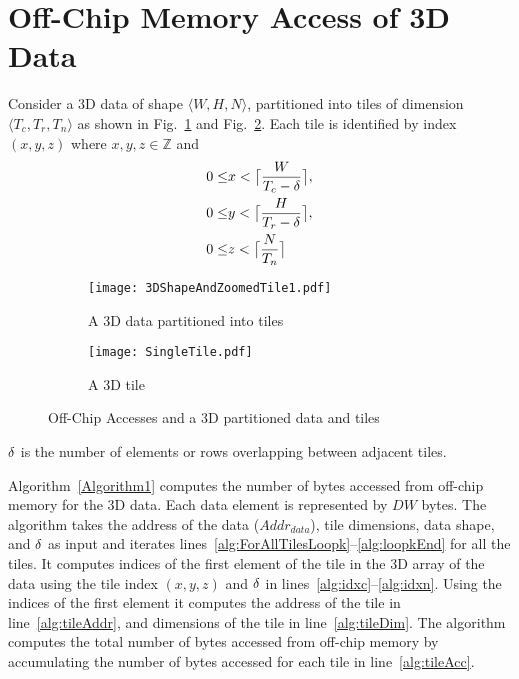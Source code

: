 \section{Off-Chip Memory Access of 3D Data}\label{sec:Access3DData}
Consider a 3D data of shape $\langle W,H,N\rangle$, partitioned into tiles of dimension $\langle T_c,T_r,T_n\rangle$ as shown in  Fig.~\ref{fig:3dTiledData} and Fig.~\ref{fig:3dTile}. Each tile is identified by index $(x,y,z)$ where $x, y, z \in \mathbb{Z}$ and 
\begin{align}\label{eq:TileIndexing}
	\begin{aligned}
		0\leq &x<\ceil[\big]{\frac{W}{T_c-\numOverlap}}, \\
		0\leq &y<\ceil[\big]{\frac{H}{T_r-\numOverlap}}, \\
		0\leq &z<\ceil[\big]{\frac{N}{T_n}}
	\end{aligned}
\end{align}
\begin{figure}[htb]
	\centering
	\captionsetup{font=sf}
	\begin{subfigure}[t]{0.5\columnwidth}
		\centering
		\texttt{[image: 3DShapeAndZoomedTile1.pdf]}
		\caption{A 3D data partitioned into tiles}
		\label{fig:3dTiledData}
	\end{subfigure}
	\begin{subfigure}[t]{0.4\columnwidth}
		\centering
		\texttt{[image: SingleTile.pdf]}
		\caption{A 3D tile}
		\label{fig:3dTile}
	\end{subfigure}
	\caption{Off-Chip Accesses and a 3D partitioned data and tiles}
	\label{fig:3DPartitionedData}
	\vspace{-1.0em}	
\end{figure}
$\numOverlap$ is the number of elements or rows overlapping between adjacent tiles.

Algorithm~\ref{Algorithm1} computes the number of bytes accessed from off-chip memory for the 3D data. Each data element is represented by $DW$ bytes. The algorithm takes the address of the data ($Addr_{data}$), tile dimensions, data shape, and $\numOverlap$ as input and iterates lines~\ref{alg:ForAllTilesLoopk}--\ref{alg:loopkEnd} for all the tiles. It computes indices of the first element of the tile in the 3D array of the data using the tile index $(x,y,z)$ and $\numOverlap$ in lines~\ref{alg:idxc}--\ref{alg:idxn}. Using the indices of the first element it computes the address of the tile in line~\ref{alg:tileAddr}, and dimensions of the tile in line~\ref{alg:tileDim}. The algorithm computes the total number of bytes accessed from off-chip memory by accumulating the number of bytes accessed for each tile in line~\ref{alg:tileAcc}. 
